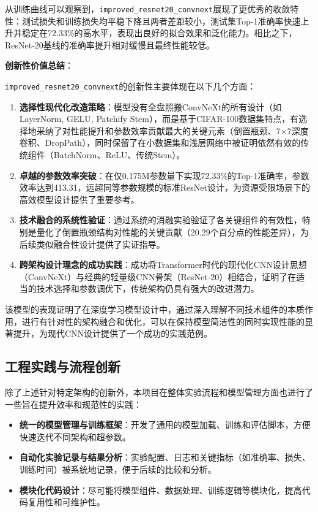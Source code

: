 \documentclass[a4paper]{article}
\begin{document}
从训练曲线可以观察到，\texttt{improved\_resnet20\_convnext}展现了更优秀的收敛特性：测试损失和训练损失均平稳下降且两者差距较小，测试集Top-1准确率快速上升并稳定在72.33\%的高水平，表现出良好的拟合效果和泛化能力。相比之下，ResNet-20基线的准确率提升相对缓慢且最终性能较低。

\textbf{创新性价值总结}：

\texttt{improved\_resnet20\_convnext}的创新性主要体现在以下几个方面：

\begin{enumerate}
    \item \textbf{选择性现代化改造策略}：模型没有全盘照搬ConvNeXt的所有设计（如LayerNorm, GELU, Patchify Stem），而是基于CIFAR-100数据集特点，有选择地采纳了对性能提升和参数效率贡献最大的关键元素（倒置瓶颈、7×7深度卷积、DropPath），同时保留了在小数据集和浅层网络中被证明依然有效的传统组件（BatchNorm、ReLU、传统Stem）。

    \item \textbf{卓越的参数效率突破}：在仅0.175M参数量下实现72.33\%的Top-1准确率，参数效率达到413.31，远超同等参数规模的标准ResNet设计，为资源受限场景下的高效模型设计提供了重要参考。

    \item \textbf{技术融合的系统性验证}：通过系统的消融实验验证了各关键组件的有效性，特别是量化了倒置瓶颈结构对性能的关键贡献（20.29个百分点的性能差异），为后续类似融合性设计提供了实证指导。

    \item \textbf{跨架构设计理念的成功实践}：成功将Transformer时代的现代化CNN设计思想（ConvNeXt）与经典的轻量级CNN骨架（ResNet-20）相结合，证明了在适当的技术选择和参数调优下，传统架构仍具有强大的改进潜力。
\end{enumerate}

该模型的表现证明了在深度学习模型设计中，通过深入理解不同技术组件的本质作用，进行有针对性的架构融合和优化，可以在保持模型简洁性的同时实现性能的显著提升，为现代CNN设计提供了一个成功的实践范例。
\subsection{工程实践与流程创新}
除了上述针对特定架构的创新外，本项目在整体实验流程和模型管理方面也进行了一些旨在提升效率和规范性的实践：

\begin{itemize}
    \item \textbf{统一的模型管理与训练框架}：开发了通用的模型加载、训练和评估脚本，方便快速迭代不同架构和超参数。
    \item \textbf{自动化实验记录与结果分析}：实验配置、日志和关键指标（如准确率、损失、训练时间）被系统地记录，便于后续的比较和分析。
    \item \textbf{模块化代码设计}：尽可能将模型组件、数据处理、训练逻辑等模块化，提高代码复用性和可维护性。
\end{itemize}
\end{document}
